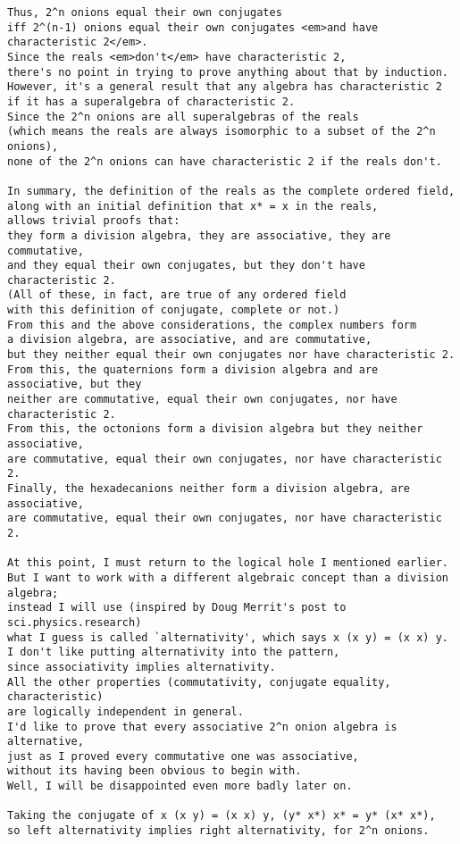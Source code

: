 \begin{verbatim}
Thus, 2^n onions equal their own conjugates
iff 2^(n-1) onions equal their own conjugates <em>and have characteristic 2</em>.
Since the reals <em>don't</em> have characteristic 2,
there's no point in trying to prove anything about that by induction.
However, it's a general result that any algebra has characteristic 2
if it has a superalgebra of characteristic 2.
Since the 2^n onions are all superalgebras of the reals
(which means the reals are always isomorphic to a subset of the 2^n onions),
none of the 2^n onions can have characteristic 2 if the reals don't.

In summary, the definition of the reals as the complete ordered field,
along with an initial definition that x* = x in the reals,
allows trivial proofs that:
they form a division algebra, they are associative, they are commutative,
and they equal their own conjugates, but they don't have characteristic 2.
(All of these, in fact, are true of any ordered field
with this definition of conjugate, complete or not.)
From this and the above considerations, the complex numbers form
a division algebra, are associative, and are commutative,
but they neither equal their own conjugates nor have characteristic 2.
From this, the quaternions form a division algebra and are associative, but they
neither are commutative, equal their own conjugates, nor have characteristic 2.
From this, the octonions form a division algebra but they neither associative,
are commutative, equal their own conjugates, nor have characteristic 2.
Finally, the hexadecanions neither form a division algebra, are associative,
are commutative, equal their own conjugates, nor have characteristic 2.

At this point, I must return to the logical hole I mentioned earlier.
But I want to work with a different algebraic concept than a division algebra;
instead I will use (inspired by Doug Merrit's post to sci.physics.research)
what I guess is called `alternativity', which says x (x y) = (x x) y.
I don't like putting alternativity into the pattern,
since associativity implies alternativity.
All the other properties (commutativity, conjugate equality, characteristic)
are logically independent in general.
I'd like to prove that every associative 2^n onion algebra is alternative,
just as I proved every commutative one was associative,
without its having been obvious to begin with.
Well, I will be disappointed even more badly later on.

Taking the conjugate of x (x y) = (x x) y, (y* x*) x* = y* (x* x*),
so left alternativity implies right alternativity, for 2^n onions.


\end{verbatim}
